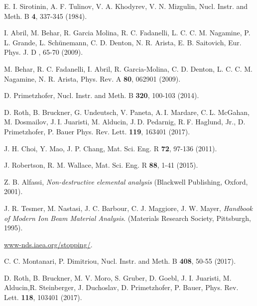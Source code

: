 \begin{thebibliography}{9}
E. I. Sirotinin, A. F. Tulinov, V. A. Khodyrev, V. N. Mizgulin, 
Nucl. Instr. and Meth. B \textbf{4}, 337-345 (1984).

I. Abril, M. Behar, R. Garcia Molina, R. C. Fadanelli, L. C. C. M. Nagamine, 
P. L. Grande, L. Sch\"unemann, C. D. Denton, N. R. Arista, E. B. Saitovich,
Eur. Phys. J. D , 65-70 (2009).

M. Behar, R. C. Fadanelli, I. Abril, R. Garcia-Molina, C. D. Denton, 
L. C. C. M. Nagamine, N. R. Arista, 
Phys. Rev. A \textbf{80},  062901 (2009).

D. Primetzhofer, 
Nucl. Instr. and Meth. B \textbf{320}, 100-103 (2014).

D. Roth, B. Bruckner, G. Undeutsch, V. Paneta, A. I. Mardare, 
C. L. McGahan, M. Dosmailov, J. I. Juaristi, M. Alducin, 
J. D. Pedarnig, R. F. Haglund, Jr., D. Primetzhofer, P. Bauer
Phys. Rev. Lett. \textbf{119}, 163401 (2017).

J. H. Choi, Y. Mao, J. P. Chang, 
Mat. Sci. Eng. R \textbf{72}, 97-136 (2011).

J. Robertson, R. M. Wallace, 
Mat. Sci. Eng. R \textbf{88}, 1-41 (2015).

Z. B. Alfassi,
\textit{Non-destructive elemental analysis}
(Blackwell Publishing, Oxford, 2001).

J. R. Tesmer, M. Nastasi, J. C. Barbour, C. J. Maggiore, J. W. Mayer,
\textit{Handbook of Modern Ion Beam Material Analysis}.
(Materials Research Society, Pittsburgh, 1995).

\href{https://www-nds.iaea.org/stopping/}{www-nds.iaea.org/stopping/}.

C. C. Montanari, P. Dimitriou, 
Nucl. Instr. and Meth. B \textbf{408},  50-55 (2017).

D. Roth, B. Bruckner, M. V. Moro, S. Gruber, D. Goebl, J. I. Juaristi, 
M. Alducin,R. Steinberger, J. Duchoslav, D. Primetzhofer, P. Bauer, 
Phys. Rev. Lett. \textbf{118}, 103401 (2017).


\end{thebibliography}
